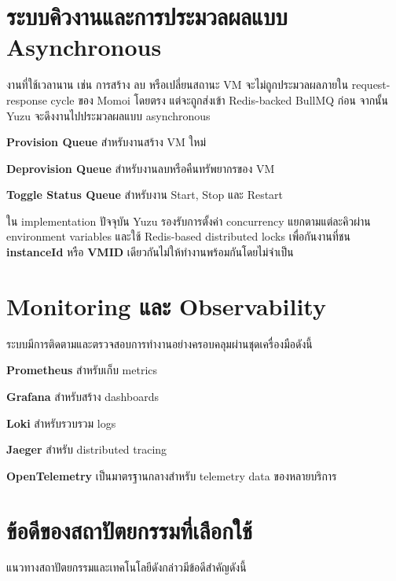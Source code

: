 \section{ระบบคิวงานและการประมวลผลแบบ Asynchronous}
\hspace*{1.3em}
งานที่ใช้เวลานาน เช่น การสร้าง ลบ หรือเปลี่ยนสถานะ VM จะไม่ถูกประมวลผลภายใน request-response cycle ของ Momoi โดยตรง แต่จะถูกส่งเข้า Redis-backed BullMQ ก่อน จากนั้น Yuzu จะดึงงานไปประมวลผลแบบ asynchronous

\begin{mycustomenum2}
    \item \textbf{Provision Queue} สำหรับงานสร้าง VM ใหม่
    \item \textbf{Deprovision Queue} สำหรับงานลบหรือคืนทรัพยากรของ VM
    \item \textbf{Toggle Status Queue} สำหรับงาน Start, Stop และ Restart
\end{mycustomenum2}

\hspace*{1.3em}
ใน implementation ปัจจุบัน Yuzu รองรับการตั้งค่า concurrency แยกตามแต่ละคิวผ่าน environment variables และใช้ Redis-based distributed locks เพื่อกันงานที่ชน \textbf{instanceId} หรือ \textbf{VMID} เดียวกันไม่ให้ทำงานพร้อมกันโดยไม่จำเป็น

\section{Monitoring และ Observability}
\hspace*{1.3em}
ระบบมีการติดตามและตรวจสอบการทำงานอย่างครอบคลุมผ่านชุดเครื่องมือดังนี้

\begin{mycustomenum2}
    \item \textbf{Prometheus} สำหรับเก็บ metrics
    \item \textbf{Grafana} สำหรับสร้าง dashboards
    \item \textbf{Loki} สำหรับรวบรวม logs
    \item \textbf{Jaeger} สำหรับ distributed tracing
    \item \textbf{OpenTelemetry} เป็นมาตรฐานกลางสำหรับ telemetry data ของหลายบริการ
\end{mycustomenum2}

\section{ข้อดีของสถาปัตยกรรมที่เลือกใช้}
\hspace*{1.3em}
แนวทางสถาปัตยกรรมและเทคโนโลยีดังกล่าวมีข้อดีสำคัญดังนี้

